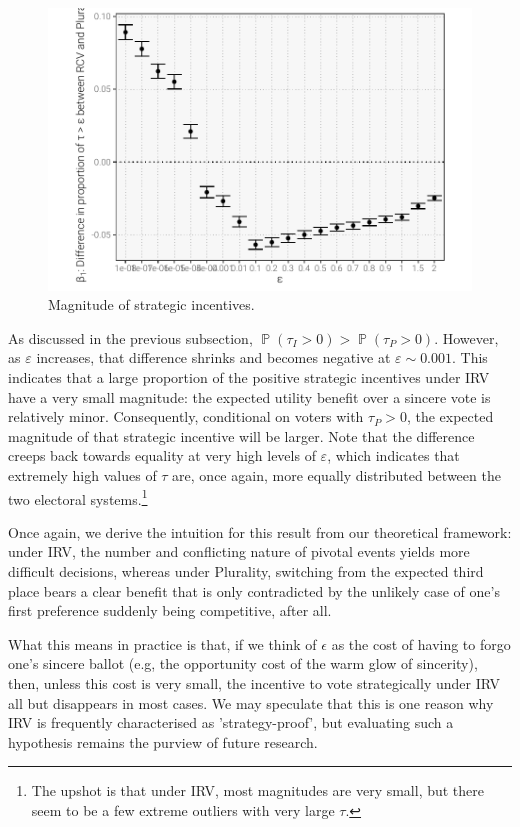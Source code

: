 \documentclass[12pt, letter]{article}
\DeclareMathOperator{\Prob}{\mathbb{P}}
\begin{document}
\begin{figure}[!htb]
	\centering
	\includegraphics[width = 0.8 \textwidth]{../output/figures/epsilon_factor_scale.pdf}
	\caption{Magnitude of strategic incentives.}
	\label{fig:sv_epsilon}
\end{figure}

As discussed in the previous subsection, $\Prob(\tau_I > 0) > \Prob(\tau_P > 0)$. However, as $\varepsilon$ increases, that difference shrinks and becomes negative at $\varepsilon \sim 0.001$. This indicates that a large proportion of the positive strategic incentives under IRV have a very small magnitude: the expected utility benefit over a sincere vote is relatively minor. Consequently, conditional on voters with $\tau_P > 0$, the expected magnitude of that strategic incentive will be larger. Note that the difference creeps back towards equality at very high levels of $\varepsilon$, which indicates that extremely high values of $\tau$ are, once again, more equally distributed between the two electoral systems.\footnote{The upshot is that under IRV, most magnitudes are very small, but there seem to be a few extreme outliers with very large $\tau$.}

Once again, we derive the intuition for this result from our theoretical framework: under IRV, the number and conflicting nature of pivotal events yields more difficult decisions, whereas under Plurality, switching from the expected third place bears a clear benefit that is only contradicted by the unlikely case of one's first preference suddenly being competitive, after all.

What this means in practice is that, if we think of $\epsilon$ as the cost of having to forgo one's sincere ballot (e.g, the opportunity cost of the warm glow of sincerity), then, unless this cost is very small, the incentive to vote strategically under IRV all but disappears in most cases. We may speculate that this is one reason why IRV is frequently characterised as 'strategy-proof', but evaluating such a hypothesis remains the purview of future research.
\end{document}
